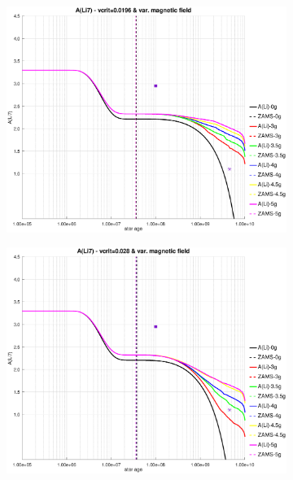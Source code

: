 \documentclass[fleqn,usenatbib]{mnras}
\begin{document}
{{\begin{figure}
    \begin{subfigure}[h]{0.47\textwidth}
    \includegraphics[trim = 35mm 15mm 15mm 15mm, clip,width=\textwidth]{figures/li_vc_0196_var_g.eps}
    \label{fig:subim23}
    \end{subfigure}
    \begin{subfigure}[h]{0.47\textwidth}
    \includegraphics[trim = 35mm 15mm 15mm 15mm, clip,width=\textwidth]{figures/li_vc_028_var_g.eps}
    \label{fig:subim24}
    \end{subfigure}
    \begin{subfigure}[h]{0.47\textwidth}

\end{subfigure}
\end{figure}}}
\end{document}
